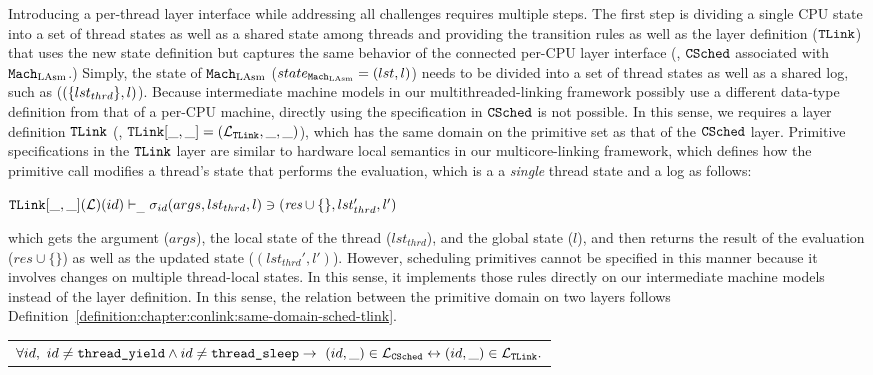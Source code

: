 Introducing a per-thread layer interface while addressing all challenges requires multiple steps. 
The first step is
dividing a single CPU state into a set of thread states as well as a shared state among threads
and providing 
the transition rules as well as the layer definition (${{\mathrm{\texttt{TLink}}}}$) that uses the new state definition but captures 
the same behavior of the connected per-CPU layer interface (\ie, ${{\mathrm{\texttt{CSched}}}}$ associated with ${\mathrm{\texttt{Mach}}}_{\mathrm{LAsm}}$.)
Simply, the state of ${\mathrm{\texttt{Mach}}}_{\mathrm{LAsm}}$ ($state_{{\mathrm{\texttt{Mach}}}_{\mathrm{LAsm}}} = (lst, l)$) needs to be divided into 
a set of thread states as well as a shared log, such as ($(\{lst_{thrd}\}, l)$).
Because intermediate machine models in our multithreaded-linking framework possibly use a different data-type definition from that of a per-CPU machine, 
directly using the specification in  ${{\mathrm{\texttt{CSched}}}}$ is not possible. 
In this sense, 
we requires a layer definition ${{\mathrm{\texttt{TLink}}}}$ (\ie, ${{\mathrm{\texttt{TLink}}}}[\_, \_] = (\mathcal{L}_{{{\mathrm{\texttt{TLink}}}}}, \_, \_)$), which has the same domain on the primitive set as that of the ${{\mathrm{\texttt{CSched}}}}$ layer.
Primitive specifications in the ${{\mathrm{\texttt{TLink}}}}$ layer are similar to hardware local semantics in our multicore-linking framework,
which defines how the primitive call modifies a thread's state that performs the evaluation, which is a
a \textit{single} thread state and a log as follows:
\begin{center}
${{\mathrm{\texttt{TLink}}}}[\_, \_](\mathcal{L})(id)
 \vdash_{\_}  \sigma_{id}(args, lst_{thrd}, l) \ni (\textit{res}\cup \{\}, lst_{thrd}', l')$
\end{center}
which gets the argument ($args$), the local state of the thread ($lst_{thrd}$), and the global state ($l$), and then 
returns the result of the evaluation ($\textit{res}\cup \{\}$) as well as the updated state ($(lst_{thrd}', l')$).
However, scheduling primitives cannot be specified in this manner because it involves changes on multiple thread-local states. 
 In this sense, it implements those rules directly on our intermediate machine models 
 instead of the layer definition.
In this sense, 
the relation between the primitive domain on two layers follows
Definition~\ref{definition:chapter:conlink:same-domain-sched-tlink}.


%

\begin{definition}
\label{definition:chapter:conlink:same-domain-sched-tlink}
\begin{tabular}{P{0.95\textwidth}}
$\forall id,\ id \neq {\mathrm{\texttt{thread\_yield}}} \wedge id \neq {\mathrm{\texttt{thread\_sleep}}} \rightarrow 
 \ (id, \_) \in \mathcal{L}_{{{\mathrm{\texttt{CSched}}}}} \leftrightarrow (id, \_) \in  \mathcal{L}_{{{\mathrm{\texttt{TLink}}}}}.$\\
\end{tabular}
\end{definition}


